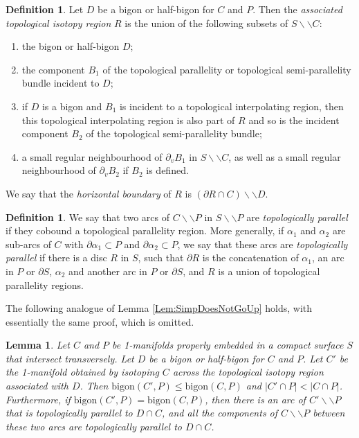 \documentclass[oneside]{amsart}
\numberwithin{equation}{section}
\theoremstyle{plain}
\newtheorem{lemma}[equation]{Lemma}
\theoremstyle{definition}
\newtheorem{definition}[equation]{Definition}
\newcommand{\cut}{\backslash\backslash}
\begin{document}
\begin{definition}
Let $D$ be a bigon or half-bigon for $C$ and $P$. Then the \emph{associated topological isotopy region} $R$ is the union of the following subsets of $S \cut C$:
\begin{enumerate}
\item the bigon or half-bigon $D$;
\item the component $B_1$ of the topological parallelity or topological semi-parallelity bundle incident to $D$;
\item if $D$ is a bigon and $B_1$ is incident to a topological interpolating region, then this topological interpolating region is also part of $R$ and so is the incident component $B_2$ of the topological semi-parallelity bundle;
\item a small regular neighbourhood of $\partial_v B_1$ in $S \cut C$, as well as a small regular neighbourhood of $\partial_v B_2$ if $B_2$ is defined.
\end{enumerate}
We say that the \emph{horizontal boundary} of $R$ is $(\partial R \cap C) \cut D$.
\end{definition}

\begin{definition}
We say that two arcs of $C \cut P$ in $S \cut P$ are \emph{topologically parallel} if they cobound a topological parallelity region. More generally, if $\alpha_1$ and $\alpha_2$ are sub-arcs of $C$ with $\partial \alpha_1 \subset P$ and $\partial \alpha_2 \subset P$, we say that these arcs are \emph{topologically parallel} if there is a disc $R$ in $S$, such that $\partial R$ is the concatenation of $\alpha_1$, an arc in $P$ or $\partial S$, $\alpha_2$ and another arc in $P$ or $\partial S$, and $R$ is a union of topological parallelity regions.
\end{definition}

The following analogue of Lemma \ref{Lem:SimpDoesNotGoUp} holds, with essentially the same proof, which is omitted.

\begin{lemma}
\label{Lem:BigonDoesNotGoUp}
Let $C$ and $P$ be 1-manifolds properly embedded in a compact surface $S$ that intersect transversely.
Let $D$ be a bigon or half-bigon for $C$ and $P$.
Let $C'$ be the 1-manifold obtained by isotoping $C$ across the topological isotopy region associated with $D$. Then $\mathrm{bigon}(C', P) \leq  \mathrm{bigon}(C,P)$ and $|C' \cap P| < |C \cap P|$. Furthermore, if $\mathrm{bigon}(C',P) =  \mathrm{bigon}(C,P)$, then there is an arc of $C' \cut P$ that is topologically parallel to $D \cap C$, and all the components of $C \cut P$ between these two arcs are topologically parallel to $D \cap C$.
\end{lemma}
\end{document}
